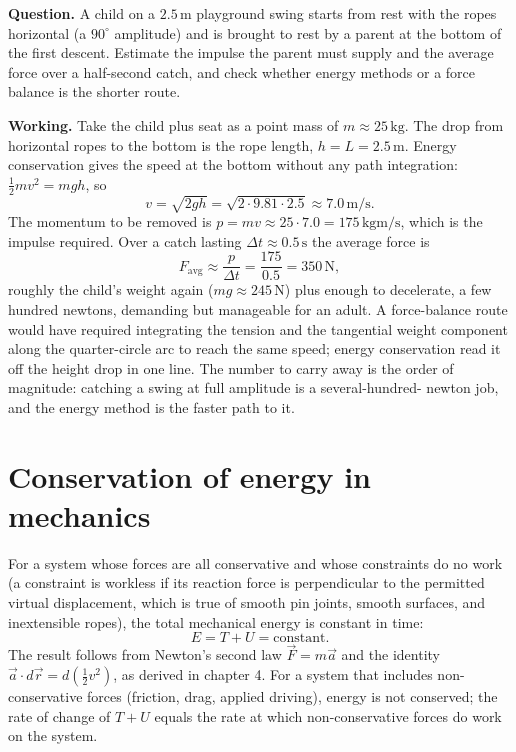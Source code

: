 \begin{estimation}
\textbf{Question.} A child on a $2.5\,\si{\meter}$ playground swing
starts from rest with the ropes horizontal (a $90^{\circ}$ amplitude)
and is brought to rest by a parent at the bottom of the first descent.
Estimate the impulse the parent must supply and the average force over a
half-second catch, and check whether energy methods or a force balance
is the shorter route.

\textbf{Working.} Take the child plus seat as a point mass of
$m \approx 25\,\si{\kilogram}$. The drop from horizontal ropes to the
bottom is the rope length, $h = L = 2.5\,\si{\meter}$. Energy
conservation gives the speed at the bottom without any path integration:
$\tfrac12 m v^2 = m g h$, so
\[
v = \sqrt{2 g h} = \sqrt{2 \cdot 9.81 \cdot 2.5}
\approx 7.0\,\si{\meter\per\second}.
\]
The momentum to be removed is $p = m v \approx 25 \cdot 7.0
= 175\,\si{\kilogram\meter\per\second}$, which is the impulse required.
Over a catch lasting $\Delta t \approx 0.5\,\si{\second}$ the average
force is
\[
F_\text{avg} \approx \frac{p}{\Delta t}
= \frac{175}{0.5} = 350\,\si{\newton},
\]
roughly the child's weight again ($mg \approx 245\,\si{\newton}$)
plus enough to decelerate, a few hundred newtons, demanding but
manageable for an adult. A force-balance route would have required
integrating the tension and the tangential weight component along the
quarter-circle arc to reach the same speed; energy conservation read it
off the height drop in one line. The number to carry away is the order
of magnitude: catching a swing at full amplitude is a several-hundred-
newton job, and the energy method is the faster path to it.
\end{estimation}

\section{Conservation of energy in mechanics}

For a system whose forces are all conservative and whose constraints
do no work (a constraint is workless if its reaction force is
perpendicular to the permitted virtual displacement, which is true of
smooth pin joints, smooth surfaces, and inextensible ropes), the
total mechanical energy is constant in time:
\[
E = T + U = \text{constant}.
\]
The result follows from Newton's second law $\vec{F} = m\vec{a}$ and
the identity $\vec{a}\cdot d\vec{r} = d(\tfrac{1}{2} v^2)$, as derived
in chapter 4. For a system that includes non-conservative forces
(friction, drag, applied driving), energy is not conserved; the rate
of change of $T + U$ equals the rate at which non-conservative forces
do work on the system.

